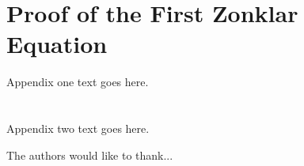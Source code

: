 \documentclass[10pt,journal,compsoc]{IEEEtran}
\begin{document}
%


\appendices
\section{Proof of the First Zonklar Equation}
Appendix one text goes here.

\section{}
Appendix two text goes here.





The authors would like to thank...


\ifCLASSOPTIONcaptionsoff
  \newpage
\fi










\end{document}
